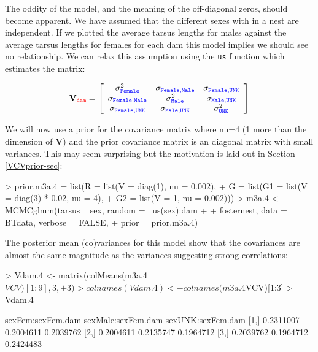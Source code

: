 \documentclass{article}
\begin{document}
The oddity of the model, and the meaning of the off-diagonal zeros, should become apparent. We have assumed that the different sexes with in a nest are independent. If we plotted the average tarsus lengths for males against the average tarsus lengths for females for each dam this model implies we should see no relationship. We can relax this assumption using the \texttt{us} function which estimates the matrix: 

\begin{displaymath}
{\bf V}_{{\color{red} \texttt{dam}}}=
\left[
\begin{array}{ccc}
\sigma^{2}_{\color{blue}\texttt{Female}}&\sigma_{\color{blue}\texttt{Female}, \texttt{Male}}&\sigma_{\color{blue}\texttt{Female}, \texttt{UNK}}\\
\sigma_{\color{blue}\texttt{Female}, \texttt{Male}}&\sigma^{2}_{\color{blue}\texttt{Male}}&\sigma_{\color{blue}\texttt{Male}, \texttt{UNK}}\\
\sigma_{\color{blue}\texttt{Female}, \texttt{UNK}}&\sigma_{\color{blue}\texttt{Male}, \texttt{UNK}}&\sigma^{2}_{\color{blue}\texttt{UNK}}\\
\end{array}
\right]
\end{displaymath}

We will now use a prior for the covariance matrix where nu=4 (1 more than the dimension of {\bf V}) and the prior covariance matrix is an diagonal matrix with small variances. This may seem surprising but the motivation is laid out in Section \ref{VCVprior-sec}: 

\begin{Schunk}
\begin{Sinput}
> prior.m3a.4 = list(R = list(V = diag(1), nu = 0.002), 
+     G = list(G1 = list(V = diag(3) * 0.02, nu = 4), 
+         G2 = list(V = 1, nu = 0.002)))
> m3a.4 <- MCMCglmm(tarsus ~ sex, random = ~us(sex):dam + 
+     fosternest, data = BTdata, verbose = FALSE, 
+     prior = prior.m3a.4)
\end{Sinput}
\end{Schunk}

The posterior mean (co)variances for this model show that the covariances are almost the same magnitude as the variances suggesting strong correlations: 

\begin{Schunk}
\begin{Sinput}
> Vdam.4 <- matrix(colMeans(m3a.4$VCV)[1:9], 3, 
+     3)
> colnames(Vdam.4) <- colnames(m3a.4$VCV)[1:3]
> Vdam.4
\end{Sinput}
\begin{Soutput}
     sexFem:sexFem.dam sexMale:sexFem.dam sexUNK:sexFem.dam
[1,]         0.2311007          0.2004611         0.2039762
[2,]         0.2004611          0.2135747         0.1964712
[3,]         0.2039762          0.1964712         0.2424483
\end{Soutput}
\end{Schunk}
\end{document}
